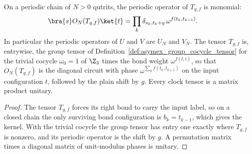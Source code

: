 \begin{lemma}
    \label{thm:asymex_z3clock_kernels}
    \leanok
    On a periodic chain of $N>0$ qutrits, the periodic operator of
    $T_{g,f}$ is monomial:
    \begin{align}
        \bra{s}O_N(T_{g,f})\ket{t} & =
        \prod_k\delta_{s_k,t_k+g}\,\omega^{f(t_k,t_{k+1})}.
    \end{align}
    In particular the periodic operators of $U$ and $V$ are $U_N$ and
    $V_N$. The tensor $T_{g,f}$ is, entrywise, the group tensor of
    Definition~\ref{def:asymex_group_cocycle_tensor} for the trivial
    cocycle $\omega_0=1$ of $\Z_3$ times the bond weight $\omega^{f(l,i)}$,
    so that $O_N(T_{g,f})$ is the diagonal circuit with phase
    $\omega^{\sum_k f(t_k,t_{k+1})}$ on the input configuration $t$, followed
    by the plain shift by $g$. Every clock tensor is a matrix product unitary.
\end{lemma}

\begin{proof}
    \leanok
    The tensor $T_{g,f}$ forces its right bond to carry the input label,
    so on a closed chain the only surviving bond configuration is
    $b_k=t_{k-1}$, which gives the kernel. With the trivial cocycle the
    group tensor has entry one exactly where $T_{g,f}$ is nonzero, and its
    periodic operator is the shift by $g$. A permutation matrix times a
    diagonal matrix of unit-modulus phases is unitary.
\end{proof}

